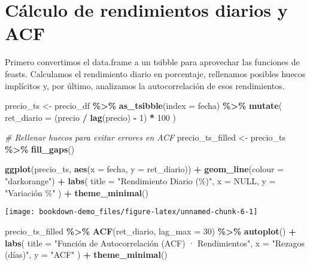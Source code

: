 \documentclass[
  11pt,
]{book}
\newenvironment{Shaded}{\begin{snugshade}}{\end{snugshade}}
\newcommand{\AttributeTok}[1]{\textcolor[rgb]{0.13,0.29,0.53}{#1}}
\newcommand{\CommentTok}[1]{\textcolor[rgb]{0.56,0.35,0.01}{\textit{#1}}}
\newcommand{\ConstantTok}[1]{\textcolor[rgb]{0.56,0.35,0.01}{#1}}
\newcommand{\DecValTok}[1]{\textcolor[rgb]{0.00,0.00,0.81}{#1}}
\newcommand{\FunctionTok}[1]{\textcolor[rgb]{0.13,0.29,0.53}{\textbf{#1}}}
\newcommand{\NormalTok}[1]{#1}
\newcommand{\OtherTok}[1]{\textcolor[rgb]{0.56,0.35,0.01}{#1}}
\newcommand{\SpecialCharTok}[1]{\textcolor[rgb]{0.81,0.36,0.00}{\textbf{#1}}}
\newcommand{\StringTok}[1]{\textcolor[rgb]{0.31,0.60,0.02}{#1}}
\begin{document}
\section{Cálculo de rendimientos diarios y ACF}\label{cuxe1lculo-de-rendimientos-diarios-y-acf}

Primero convertimos el data.frame a un tsibble para aprovechar las funciones de feasts. Calculamos el rendimiento diario en porcentaje, rellenamos posibles huecos implícitos y, por último, analizamos la autocorrelación de esos rendimientos.

\begin{Shaded}
\begin{Highlighting}[]
\NormalTok{precio\_ts }\OtherTok{\textless{}{-}}\NormalTok{ precio\_df }\SpecialCharTok{\%\textgreater{}\%}
  \FunctionTok{as\_tsibble}\NormalTok{(}\AttributeTok{index =}\NormalTok{ fecha) }\SpecialCharTok{\%\textgreater{}\%}
  \FunctionTok{mutate}\NormalTok{(}
    \AttributeTok{ret\_diario =}\NormalTok{ (precio }\SpecialCharTok{/} \FunctionTok{lag}\NormalTok{(precio) }\SpecialCharTok{{-}} \DecValTok{1}\NormalTok{) }\SpecialCharTok{*} \DecValTok{100}
\NormalTok{  )}

\CommentTok{\# Rellenar huecos para evitar errores en ACF}
\NormalTok{precio\_ts\_filled }\OtherTok{\textless{}{-}}\NormalTok{ precio\_ts }\SpecialCharTok{\%\textgreater{}\%}
  \FunctionTok{fill\_gaps}\NormalTok{()}

\FunctionTok{ggplot}\NormalTok{(precio\_ts, }\FunctionTok{aes}\NormalTok{(}\AttributeTok{x =}\NormalTok{ fecha, }\AttributeTok{y =}\NormalTok{ ret\_diario)) }\SpecialCharTok{+}
  \FunctionTok{geom\_line}\NormalTok{(}\AttributeTok{colour =} \StringTok{"darkorange"}\NormalTok{) }\SpecialCharTok{+}
  \FunctionTok{labs}\NormalTok{(}
    \AttributeTok{title =} \StringTok{"Rendimiento Diario (\%)"}\NormalTok{,}
    \AttributeTok{x     =} \ConstantTok{NULL}\NormalTok{,}
    \AttributeTok{y     =} \StringTok{"Variación \%"}
\NormalTok{  ) }\SpecialCharTok{+}
  \FunctionTok{theme\_minimal}\NormalTok{()}
\end{Highlighting}
\end{Shaded}

\begin{center}\texttt{[image: bookdown-demo\_files/figure-latex/unnamed-chunk-6-1]} \end{center}

\begin{Shaded}
\begin{Highlighting}[]
\NormalTok{precio\_ts\_filled }\SpecialCharTok{\%\textgreater{}\%}
  \FunctionTok{ACF}\NormalTok{(ret\_diario, }\AttributeTok{lag\_max =} \DecValTok{30}\NormalTok{) }\SpecialCharTok{\%\textgreater{}\%}
  \FunctionTok{autoplot}\NormalTok{() }\SpecialCharTok{+}
  \FunctionTok{labs}\NormalTok{(}
    \AttributeTok{title =} \StringTok{"Función de Autocorrelación (ACF) · Rendimientos"}\NormalTok{,}
    \AttributeTok{x     =} \StringTok{"Rezagos (días)"}\NormalTok{,}
    \AttributeTok{y     =} \StringTok{"ACF"}
\NormalTok{  ) }\SpecialCharTok{+}
  \FunctionTok{theme\_minimal}\NormalTok{()}
\end{Highlighting}
\end{Shaded}
\end{document}
